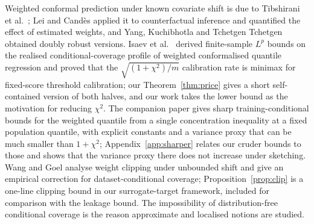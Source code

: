 \documentclass[11pt,a4paper]{article}
\theoremstyle{plain}
\theoremstyle{definition}
\theoremstyle{remark}
\begin{document}
Weighted conformal prediction under known covariate shift is due to Tibshirani et al.\ \cite{tibshirani2019}; Lei and Cand\`es \cite{lei2021} applied it to counterfactual inference and quantified the effect of estimated weights, and Yang, Kuchibhotla and Tchetgen Tchetgen \cite{yang2024} obtained doubly robust versions. Isaev et al.\ \cite{isaev2026} derived finite-sample $L^p$ bounds on the realised conditional-coverage profile of weighted conformalised quantile regression \cite{romano2019} and proved that the $\sqrt{(1+\chi^2)/m}$ calibration rate is minimax for fixed-score threshold calibration; our Theorem~\ref{thm:price} gives a short self-contained version of both halves, and our work takes the lower bound as the motivation for reducing $\chi^2$. The companion paper \cite{pournaderi2026} gives sharp training-conditional bounds for the weighted quantile from a single concentration inequality at a fixed population quantile, with explicit constants and a variance proxy that can be much smaller than $1+\chi^2$; Appendix~\ref{app:sharper} relates our cruder bounds to those and shows that the variance proxy there does not increase under sketching. Wang and Goel \cite{wang2026} analyse weight clipping under unbounded shift and give an empirical correction for dataset-conditional coverage; Proposition~\ref{prop:clip} is a one-line clipping bound in our surrogate-target framework, included for comparison with the leakage bound. The impossibility of distribution-free conditional coverage \cite{vovk2012,barber2021} is the reason approximate and localised notions \cite{guan2023,gibbs2023} are studied.
\end{document}
